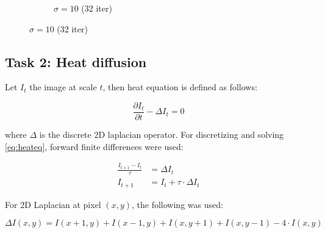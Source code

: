 \documentclass[paper=a4, fontsize=11pt]{scrartcl} %
\numberwithin{equation}{section} %
\numberwithin{figure}{section} %
\numberwithin{table}{section} %
\begin{document}
\begin{figure}[b]
\begin{subfigure}[b]{0.3\textwidth}
		\noindent{}
	\caption{$\sigma = 10$ (32 iter)}
	\end{subfigure}
\end{figure}



\subsection{Task 2: Heat diffusion}

Let $I_t$ the image at scale $t$, then heat equation is defined as follows:

\begin{equation} \label{eq:heateq}
	\frac{\partial I_t}{\partial t} - \Delta I_t = 0
\end{equation}

where $\Delta$ is the discrete 2D laplacian operator. For discretizing and solving \ref{eq:heateq}, forward finite differences were used:

\begin{align}
	\frac{I_{t+1} - I_t}{\tau} &= \Delta I_t \\
	I_{t+1} &= I_t + \tau \cdot \Delta I_t \label{eq:dichd}
\end{align}

For 2D Laplacian at pixel $(x, y)$, the following was used:

\begin{equation}
	\Delta I(x, y) = I(x+1, y) + I(x-1, y) + I(x, y+1) + I(x, y - 1) - 4 \cdot I(x, y) \label{eq:laplace}
\end{equation}
\end{document}
